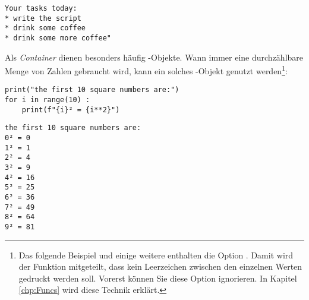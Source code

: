 \begin{cmdbox}
\begin{verbatim}
Your tasks today:
* write the script
* drink some coffee
* drink some more coffee"
\end{verbatim}
\end{cmdbox}

Als \emph{Container} dienen besonders häufig -Objekte. Wann immer eine durchzählbare Menge von Zahlen gebraucht wird, kann ein solches -Objekt genutzt werden\footnote{Das folgende Beispiel und einige weitere enthalten die Option . Damit wird der Funktion  mitgeteilt, dass kein Leerzeichen zwischen den einzelnen Werten gedruckt werden soll. Vorerst können Sie diese Option ignorieren. In Kapitel \ref{chp:Funcs} wird diese Technik erklärt.}:

\begin{codebox}
\begin{verbatim}
print("the first 10 square numbers are:")
for i in range(10) :
    print(f"{i}² = {i**2}")
\end{verbatim}
\end{codebox}

\begin{cmdbox}
\begin{verbatim}
the first 10 square numbers are:
0² = 0
1² = 1
2² = 4
3² = 9
4² = 16
5² = 25
6² = 36
7² = 49
8² = 64
9² = 81
\end{verbatim}
\end{cmdbox}


